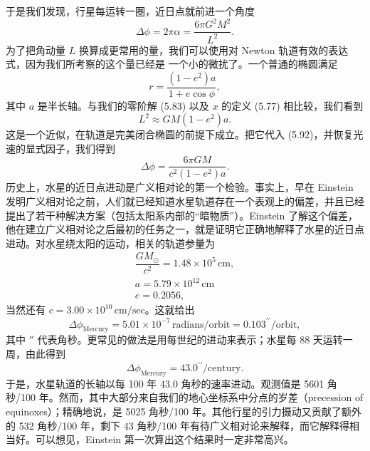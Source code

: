 于是我们发现，行星每运转一圈，近日点就前进一个角度
\begin{equation*}
\Delta\phi = 2\pi\alpha = \frac{6\pi G^2M^2}{L^2}.
\tag{5.92}
\end{equation*}
为了把角动量 $L$ 换算成更常用的量，我们可以使用对 Newton 轨道有效的表达式，因为我们所考察的这个量已经是
一个小的微扰了。一个普通的椭圆满足
\begin{equation*}
r = \frac{(1-e^2)a}{1+e\cos\phi},
\tag{5.93}
\end{equation*}
其中 $a$ 是半长轴。与我们的零阶解 (5.83) 以及 $x$ 的定义 (5.77) 相比较，我们看到
\begin{equation*}
L^2 \approx GM(1-e^2)a.
\tag{5.94}
\end{equation*}
这是一个近似，在轨道是完美闭合椭圆的前提下成立。把它代入 (5.92)，并恢复光速的显式因子，我们得到
\begin{equation*}
\Delta\phi = \frac{6\pi GM}{c^2(1-e^2)a}.
\tag{5.95}
\end{equation*}
历史上，水星的近日点进动是广义相对论的第一个检验。事实上，早在 Einstein 发明广义相对论之前，人们就已经知道水星轨道存在一个表观上的偏差，并且已经提出了若干种解决方案（包括太阳系内部的“暗物质”）。Einstein 了解这个偏差，他在建立广义相对论之后最初的任务之一，就是证明它正确地解释了水星的近日点进动。对水星绕太阳的运动，相关的轨道参量为
\begin{equation*}
\begin{array}{c}
\dfrac{GM_\odot}{c^2} = 1.48\times 10^5\,\mathrm{cm},\\[8pt]
a = 5.79\times 10^{12}\,\mathrm{cm}\\[6pt]
e = 0.2056,
\end{array}
\tag{5.96}
\end{equation*}
当然还有 $c = 3.00\times 10^{10}\,\mathrm{cm/sec}$。这就给出
\begin{equation*}
\Delta\phi_{\mathrm{Mercury}} = 5.01\times 10^{-7}\,\mathrm{radians/orbit} = 0.103^{\prime\prime}/\mathrm{orbit},
\tag{5.97}
\end{equation*}
其中 $''$ 代表角秒。更常见的做法是用每世纪的进动来表示；水星每 88 天运转一周，由此得到
\begin{equation*}
\Delta\phi_{\mathrm{Mercury}} = 43.0^{\prime\prime}/\mathrm{century}.
\tag{5.98}
\end{equation*}
于是，水星轨道的长轴以每 100 年 43.0 角秒的速率进动。观测值是 5601 角秒/100 年。然而，其中大部分来自我们的地心坐标系中分点的岁差（precession of equinoxes）；精确地说，是 5025 角秒/100 年。其他行星的引力摄动又贡献了额外的 532 角秒/100 年，剩下 43 角秒/100 年有待广义相对论来解释，而它解释得相当好。可以想见，Einstein 第一次算出这个结果时一定非常高兴。


